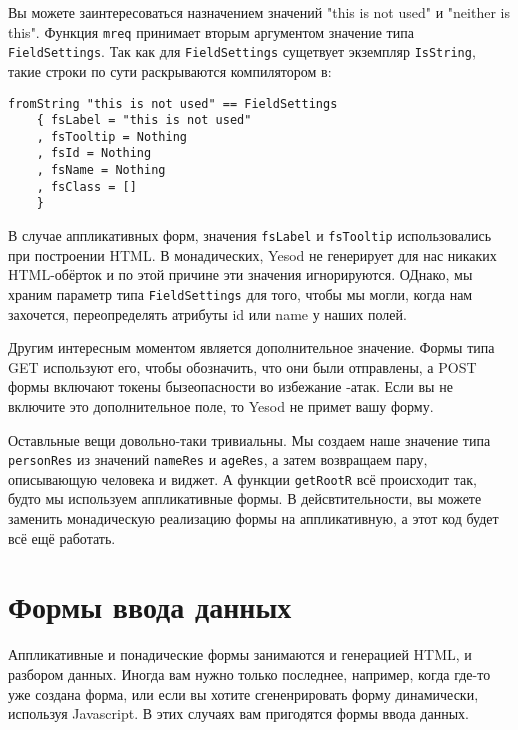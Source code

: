 Вы можете заинтересоваться назначением значений "this is not used" и "neither is this".
Функция \lstinline'mreq' принимает вторым аргументом значение типа \lstinline'FieldSettings'.
Так как для \lstinline'FieldSettings' сущетвует экземпляр \lstinline'IsString', такие строки 
по сути раскрываются компилятором в:

\begin{lstlisting}
fromString "this is not used" == FieldSettings
    { fsLabel = "this is not used"
    , fsTooltip = Nothing
    , fsId = Nothing
    , fsName = Nothing
    , fsClass = []
    }
\end{lstlisting}

В случае аппликативных форм, значения \lstinline'fsLabel' и \lstinline'fsTooltip'
использовались при построении HTML. В монадических, Yesod не генерирует для нас
никаких HTML-обёрток и по этой причине эти значения игнорируются. ОДнако, мы храним 
параметр типа \lstinline'FieldSettings' для того, чтобы мы могли, когда нам захочется, переопределять атрибуты id или name у наших полей.

Другим интересным моментом является дополнительное значение. Формы типа GET используют
его, чтобы обозначить, что они были отправлены, а POST формы включают токены бызеопасности
во избежание 
-атак. 
Если вы не включите это дополнительное поле, то Yesod не примет вашу форму.

Оставльные вещи довольно-таки тривиальны. Мы создаем наше значение типа 
\lstinline'personRes' из значений \lstinline'nameRes' и \lstinline'ageRes', а 
затем возвращаем пару, описывающую человека и виджет. А функции \lstinline'getRootR'
всё происходит так, будто мы используем аппликативные формы. В дейсвтительности, вы можете 
заменить монадическую реализацию формы на аппликативную, а этот код будет всё ещё работать.

\section{Формы ввода данных}
Аппликативные и понадические формы занимаются и генерацией HTML, и разбором данных.
Иногда вам нужно только последнее, например, когда где-то уже создана форма, или если вы
хотите сгененрировать форму динамически, используя Javascript. В этих случаях вам пригодятся
формы ввода данных.


